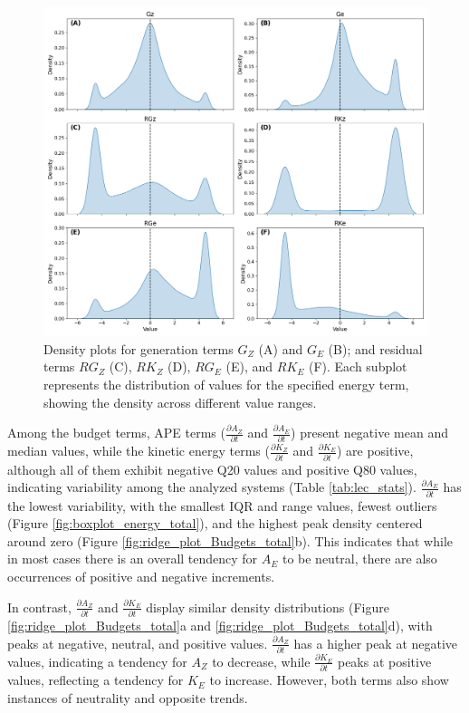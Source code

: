 \begin{figure}[!htbp]
\centering
\includegraphics[width=32pc]{figs_5/ridge_plot_Generation_Dissipation_Terms_total.png}
\caption[Density Plots - Generation Terms]{Density plots for generation terms $G_Z$ (A) and $G_E$ (B); and residual terms $RG_Z$ (C), $RK_Z$ (D), $RG_E$ (E), and $RK_E$ (F). Each subplot represents the distribution of values for the specified energy term, showing the density across different value ranges.}
\label{fig:ridge_plot_Generation_Dissipation_Terms_total}
\end{figure}

Among the budget terms, APE terms ($\frac{\partial A_Z}{\partial t}$ and $\frac{\partial A_E}{\partial t}$) present negative mean and median values, while the kinetic energy terms ($\frac{\partial K_Z}{\partial t}$ and $\frac{\partial K_E}{\partial t}$) are positive, although all of them exhibit negative Q20 values and positive Q80 values, indicating variability among the analyzed systems (Table \ref{tab:lec_stats}).  $\frac{\partial A_E}{\partial t}$ has the lowest variability, with the smallest IQR and range values, fewest outliers (Figure \ref{fig:boxplot_energy_total}), and the highest peak density centered around zero (Figure \ref{fig:ridge_plot_Budgets_total}b). This indicates that while in most cases there is an overall tendency for $A_E$ to be neutral, there are also occurrences of positive and negative increments.

In contrast, $\frac{\partial A_Z}{\partial t}$ and $\frac{\partial K_E}{\partial t}$ display similar density distributions (Figure \ref{fig:ridge_plot_Budgets_total}a and \ref{fig:ridge_plot_Budgets_total}d), with peaks at negative, neutral, and positive values. $\frac{\partial A_Z}{\partial t}$ has a higher peak at negative values, indicating a tendency for $A_Z$ to decrease, while $\frac{\partial K_E}{\partial t}$ peaks at positive values, reflecting a tendency for $K_E$ to increase. However, both terms also show instances of neutrality and opposite trends.

